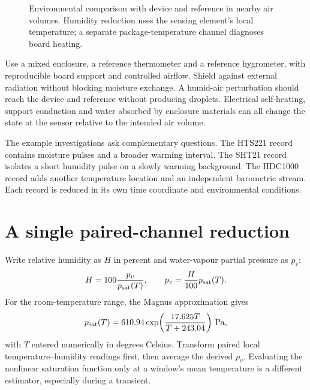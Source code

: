 \begin{figure}[t]
\centering
{}
\caption{Environmental comparison with device and reference in nearby air volumes. Humidity reduction uses the sensing element's local temperature; a separate package-temperature channel diagnoses board heating.}
\label{fig:temperature-humidity-apparatus}
\end{figure}

Use a mixed enclosure, a reference thermometer and a reference hygrometer, with reproducible board support and controlled airflow. Shield against external radiation without blocking moisture exchange. A humid-air perturbation should reach the device and reference without producing droplets. Electrical self-heating, support conduction and water absorbed by enclosure materials can all change the state at the sensor relative to the intended air volume.

The example investigations ask complementary questions. The HTS221 record contains moisture pulses and a broader warming interval. The SHT21 record isolates a short humidity pulse on a slowly warming background. The HDC1000 record adds another temperature location and an independent barometric stream. Each record is reduced in its own time coordinate and environmental conditions.

\section{A single paired-channel reduction}
Write relative humidity as $H$ in percent and water-vapour partial pressure as $p_v$:
\begin{equation}
 H=100\frac{p_v}{p_{\rm sat}(T)},\qquad
 p_v=\frac{H}{100}p_{\rm sat}(T).
 \label{eq:temperature-humidity-ratio}
\end{equation}
For the room-temperature range, the Magnus approximation gives~\cite{alduchov1996}
\begin{equation}
 p_{\rm sat}(T)=610.94\exp\!\left(\frac{17.625T}{T+243.04}\right)\,\mathrm{Pa},
 \label{eq:temperature-humidity-magnus}
\end{equation}
with $T$ entered numerically in degrees Celsius. Transform paired local temperature--humidity readings first, then average the derived $p_v$. Evaluating the nonlinear saturation function only at a window's mean temperature is a different estimator, especially during a transient.


